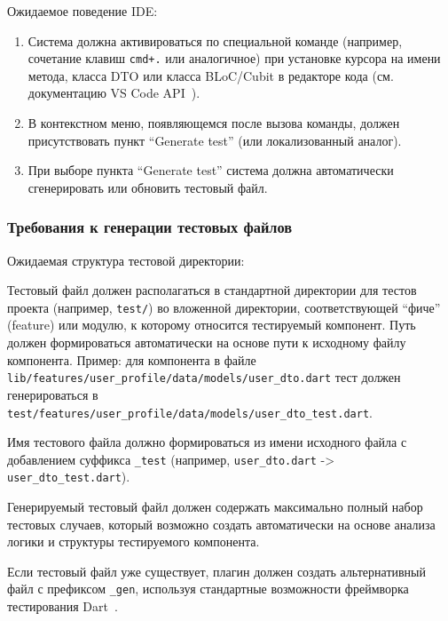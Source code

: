\documentclass[14pt, russian]{scrartcl}
\newcommand{\enq}[1]{\enquote{#1}}
\begin{document}
Ожидаемое поведение IDE:

\begin{enumerate}
    \item Система должна активироваться по специальной команде (например, сочетание клавиш \texttt{cmd+.} или аналогичное) при установке курсора на имени метода, класса DTO или класса BLoC/Cubit в редакторе кода (см. документацию VS Code API~\cite{VSCodeAPI}).
    \item В контекстном меню, появляющемся после вызова команды, должен присутствовать пункт \enq{Generate test} (или локализованный аналог).
    \item При выборе пункта \enq{Generate test} система должна автоматически сгенерировать или обновить тестовый файл.
\end{enumerate}

\subsubsection{Требования к генерации тестовых файлов}

Ожидаемая структура тестовой директории:

\begin{enumerate*}
    \item Тестовый файл должен располагаться в стандартной директории для тестов проекта (например, \texttt{test/}) во вложенной директории, соответствующей \enq{фиче} (feature) или модулю, к которому относится тестируемый компонент. Путь должен формироваться автоматически на основе пути к исходному файлу компонента. Пример: для компонента в файле \texttt{lib/features/user\_profile/data/models/user\_dto.dart} тест должен генерироваться в \\ \texttt{test/features/user\_profile/data/models/user\_dto\_test.dart}.
    \item Имя тестового файла должно формироваться из имени исходного файла с добавлением суффикса \texttt{\_test} (например, \texttt{user\_dto.dart} -> \texttt{user\_dto\_test.dart}).
    \item Генерируемый тестовый файл должен содержать максимально полный набор тестовых случаев, который возможно создать автоматически на основе анализа логики и структуры тестируемого компонента.
    \item Если тестовый файл уже существует, плагин должен создать альтернативный файл с префиксом \texttt{\_gen}, используя стандартные возможности фреймворка тестирования Dart~\cite{DartTestPackage}.
\end{enumerate*}
\end{document}
